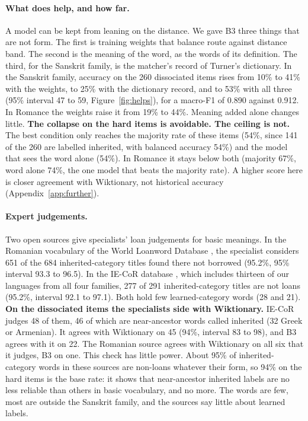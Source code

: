 \documentclass[11pt]{article}
\begin{document}
\paragraph{What does help, and how far.} A model can be kept from leaning on the distance. We gave B3 three things that are not form. The first is training weights that balance route against distance band. The second is the meaning of the word, as the words of its definition. The third, for the Sanskrit family, is the matcher's record of Turner's dictionary. In the Sanskrit family, accuracy on the 260 dissociated items rises from 10\% to 41\% with the weights, to 25\% with the dictionary record, and to 53\% with all three (95\% interval 47 to 59, Figure~\ref{fig:helps}), for a macro-F1 of 0.890 against 0.912. In Romance the weights raise it from 19\% to 44\%. Meaning added alone changes little. \textbf{The collapse on the hard items is avoidable. The ceiling is not.} The best condition only reaches the majority rate of these items (54\%, since 141 of the 260 are labelled inherited, with balanced accuracy 54\%) and the model that sees the word alone (54\%). In Romance it stays below both (majority 67\%, word alone 74\%, the one model that beats the majority rate). A higher score here is closer agreement with Wiktionary, not historical accuracy (Appendix~\ref{app:further}).

\paragraph{Expert judgements.} Two open sources give specialists' loan judgements for basic meanings. In the Romanian vocabulary of the World Loanword Database \citep{schulte2009romanian}, the specialist considers 651 of the 684 inherited-category titles found there not borrowed (95.2\%, 95\% interval 93.3 to 96.5). In the IE-CoR database \citep{heggarty2024iecor}, which includes thirteen of our languages from all four families, 277 of 291 inherited-category titles are not loans (95.2\%, interval 92.1 to 97.1). Both hold few learned-category words (28 and 21). \textbf{On the dissociated items the specialists side with Wiktionary.} IE-CoR judges 48 of them, 46 of which are near-ancestor words called inherited (32 Greek or Armenian). It agrees with Wiktionary on 45 (94\%, interval 83 to 98), and B3 agrees with it on 22. The Romanian source agrees with Wiktionary on all six that it judges, B3 on one. This check has little power. About 95\% of inherited-category words in these sources are non-loans whatever their form, so 94\% on the hard items is the base rate: it shows that near-ancestor inherited labels are no less reliable than others in basic vocabulary, and no more. The words are few, most are outside the Sanskrit family, and the sources say little about learned labels.
\end{document}
